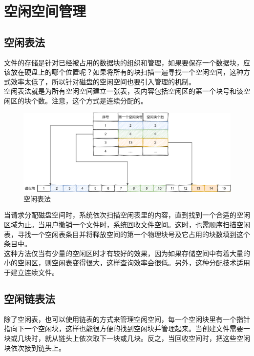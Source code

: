 \newpage

\section{空闲空间管理}

\subsection{空闲表法}

文件的存储是针对已经被占用的数据块的组织和管理，如果要保存一个数据块，应该放在硬盘上的哪个位置呢？如果将所有的块扫描一遍寻找一个空闲空间，这种方式效率太低了，所以针对磁盘的空闲空间也要引入管理的机制。\\

空闲表法就是为所有空闲空间建立一张表，表内容包括空闲区的第一个块号和该空闲区的块个数。注意，这个方式是连续分配的。

\begin{figure}[H]
    \centering
    \includegraphics[scale=0.25]{img/C5/5-5/1.png}
    \caption{空闲表法}
\end{figure}

当请求分配磁盘空间时，系统依次扫描空闲表里的内容，直到找到一个合适的空闲区域为止。当用户撤销一个文件时，系统回收文件空间。这时，也需顺序扫描空闲表，寻找一个空闲表条目并将释放空间的第一个物理块号及它占用的块数填到这个条目中。\\

这种方法仅当有少量的空闲区时才有较好的效果，因为如果存储空间中有着大量的小的空闲区，则空闲表变得很大，这样查询效率会很低。另外，这种分配技术适用于建立连续文件。\\

\subsection{空闲链表法}

除了空闲表，也可以使用链表的方式来管理空闲空间，每一个空闲块里有一个指针指向下一个空闲块，这样也能很方便的找到空闲块并管理起来。当创建文件需要一块或几块时，就从链头上依次取下一块或几块。反之，当回收空间时，把这些空闲块依次接到链头上。

